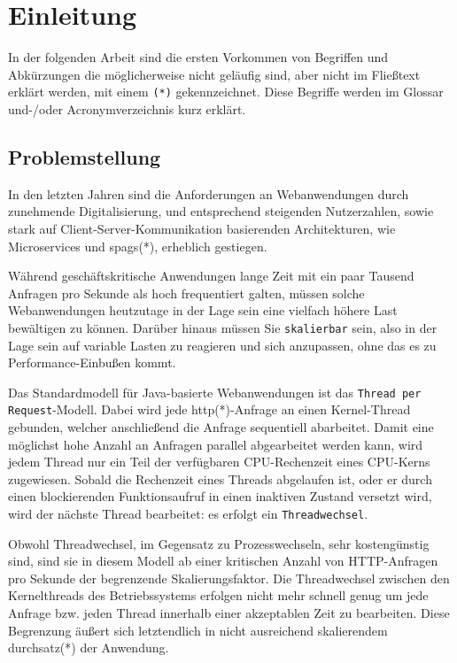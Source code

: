 \section{Einleitung}
\label{sec:einleitung}
In der folgenden Arbeit sind die ersten Vorkommen von Begriffen und Abkürzungen die möglicherweise nicht geläufig sind, aber
nicht im Fließtext erklärt werden, mit einem \verb|(*)| gekennzeichnet.
Diese Begriffe werden im Glossar und-/oder Acronymverzeichnis kurz erklärt.

\subsection{Problemstellung}
\label{subsec:problemstellung}
In den letzten Jahren sind die Anforderungen an Webanwendungen durch zunehmende Digitalisierung, und entsprechend steigenden Nutzerzahlen,
sowie stark auf Client-Server-Kommunikation basierenden Architekturen, wie Microservices und \Glspl{spag}(*), erheblich gestiegen.

Während geschäftskritische Anwendungen lange Zeit mit ein paar Tausend Anfragen pro Sekunde als hoch frequentiert
galten, müssen solche Webanwendungen heutzutage in der Lage sein eine vielfach höhere Last bewältigen zu können.
Darüber hinaus müssen Sie \verb|skalierbar| sein, also in der Lage sein auf variable Lasten zu reagieren
und sich anzupassen, ohne das es zu Performance-Einbußen kommt.

Das Standardmodell für Java-basierte Webanwendungen ist das \verb|Thread per Request|-Modell.
Dabei wird jede \acrshort{http}(*)-Anfrage an einen Kernel-Thread gebunden, welcher anschließend die Anfrage sequentiell abarbeitet.
Damit eine möglichst hohe Anzahl an Anfragen parallel abgearbeitet werden kann, wird jedem Thread nur ein Teil der verfügbaren
CPU-Rechenzeit eines CPU-Kerns zugewiesen. Sobald die Rechenzeit eines Threads abgelaufen ist, oder er durch einen blockierenden
Funktionsaufruf in einen inaktiven Zustand versetzt wird, wird der nächste Thread bearbeitet: es erfolgt ein \verb|Threadwechsel|.

Obwohl Threadwechsel, im Gegensatz zu Prozesswechseln, sehr kostengünstig sind, sind sie in diesem Modell ab einer kritischen Anzahl von HTTP-Anfragen
pro Sekunde der begrenzende Skalierungsfaktor. Die Threadwechsel zwischen den Kernelthreads des Betriebssystems erfolgen nicht mehr
schnell genug um jede Anfrage bzw. jeden Thread innerhalb einer akzeptablen Zeit zu bearbeiten.
Diese Begrenzung äußert sich letztendlich in nicht ausreichend skalierendem \Gls{durchsatz}(*) der Anwendung.

